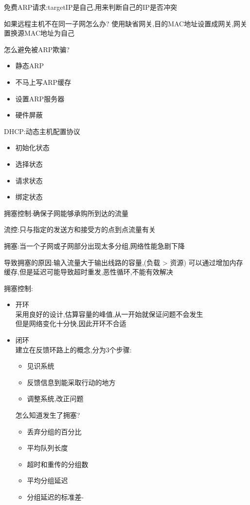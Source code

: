 \documentclass[UTF8,a4paper]{ctexart}
\begin{document}
免费ARP请求:targetIP是自己,用来判断自己的IP是否冲突

如果远程主机不在同一子网怎么办?
使用缺省网关,目的MAC地址设置成网关,网关置换源MAC地址为自己

怎么避免被ARP欺骗?
\begin{itemize}
  \item 静态ARP
  \item 不马上写ARP缓存
  \item 设置ARP服务器
  \item 硬件屏蔽
\end{itemize}

DHCP:动态主机配置协议
\begin{itemize}
  \item 初始化状态
  \item 选择状态
  \item 请求状态
  \item 绑定状态
\end{itemize}

拥塞控制:确保子网能够承购所到达的流量

流控:只与指定的发送方和接受方的点到点流量有关

拥塞:当一个子网或子网部分出现太多分组,网络性能急剧下降

导致拥塞的原因:输入流量大于输出线路的容量,(负载 > 资源)
可以通过增加内存缓存,但是延迟可能导致超时重发,恶性循环,不能有效解决

拥塞控制:
\begin{itemize}
  \item 开环\\
  采用良好的设计,估算容量的峰值,从一开始就保证问题不会发生\\
  但是网络变化十分快,因此开环不合适
  \item 闭环\\
  建立在反馈环路上的概念,分为3个步骤:
  \begin{itemize}
    \item 见识系统
    \item 反馈信息到能采取行动的地方
    \item 调整系统,改正问题
  \end{itemize}

  怎么知道发生了拥塞?
  \begin{itemize}
    \item 丢弃分组的百分比
    \item 平均队列长度
    \item 超时和重传的分组数
    \item 平均分组延迟
    \item 分组延迟的标准差-
  \end{itemize}
\end{itemize}
\end{document}
